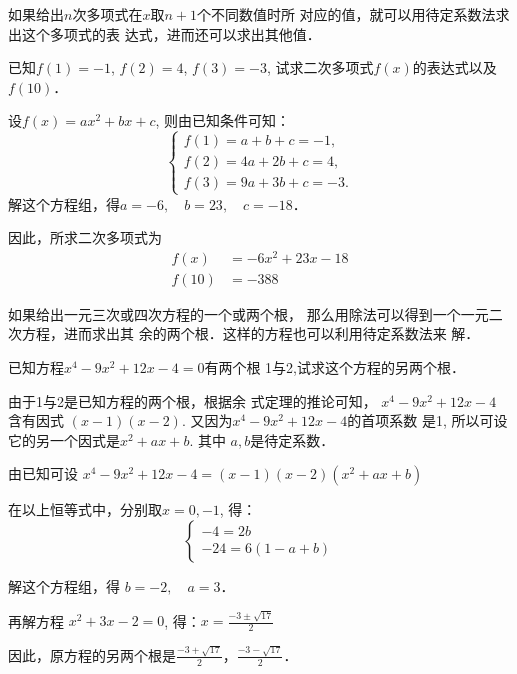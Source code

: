 如果给出$n$次多项式在$x$取$n+1$个不同数值时所
对应的值，就可以用待定系数法求出这个多项式的表
达式，进而还可以求出其他值．




\begin{example}
    已知$f(1)=-1$, $f(2)=4$, $f(3)=-3$,
试求二次多项式$f(x)$的表达式以及$f(10)$．
\end{example}

\begin{solution}
    设$f(x)=ax^2+bx+c$,
则由已知条件可知：
\[\begin{cases}
    f(1)=a+b+c=-1,\\
f(2)=4a+2b+c=4,\\
f(3)=9a+3b+c=-3.
\end{cases}\]
解这个方程组，得$a=-6,\quad b=23,\quad c=-18$．

因此，所求二次多项式为
\[\begin{split}
    f(x)&=-6x^2+23x-18\\
f(10)&=-388
\end{split}\]
\end{solution}

如果给出一元三次或四次方程的一个或两个根，
那么用除法可以得到一个一元二次方程，进而求出其
余的两个根．这样的方程也可以利用待定系数法来
解．


\begin{example}
   已知方程$x^4-9x^2+12x-4=0$有两个根
1与2,试求这个方程的另两个根． 
\end{example}

\begin{analyze}
由于1与2是已知方程的两个根，根据余
式定理的推论可知，
$x^4-9x^2+12x-4$
含有因式
$(x-1)(x-2)$. 又因为$x^4-9x^2+12x-4$的首项系数
是1, 所以可设它的另一个因式是$x^2+ax+b$. 其中
$a,b$是待定系数．
\end{analyze}

\begin{solution}
    由已知可设
$x^4-9x^2+12x-4=(x-1)(x-2)(x^2+ax+b)$

在以上恒等式中，分别取$x=0,-1$, 得：
\[\begin{cases}
    -4=2b\\
-24=6(1-a+b)
\end{cases}\]

解这个方程组，得 $b=-2,\quad a=3$．

再解方程 $x^2+3x-2=0$, 得：$x=\frac{-3\pm\sqrt{17}}{2}$

因此，原方程的另两个根是$\frac{-3+\sqrt{17}}{2}$，$\frac{-3-\sqrt{17}}{2}$．
\end{solution}

